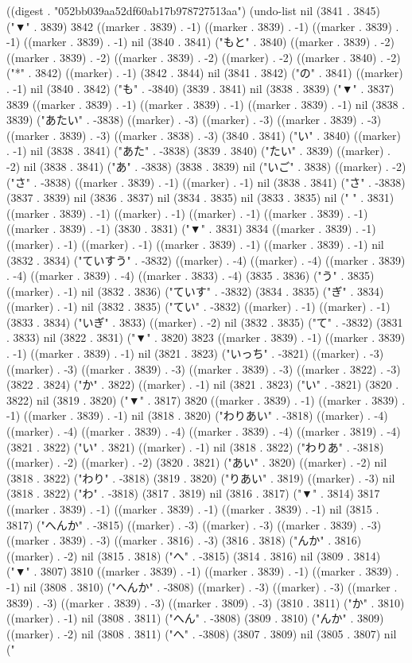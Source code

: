 
((digest . "052bb039aa52df60ab17b978727513aa") (undo-list nil (3841 . 3845) ("▼" . 3839) 3842 ((marker . 3839) . -1) ((marker . 3839) . -1) ((marker . 3839) . -1) ((marker . 3839) . -1) nil (3840 . 3841) ("もと" . 3840) ((marker . 3839) . -2) ((marker . 3839) . -2) ((marker . 3839) . -2) ((marker) . -2) ((marker . 3840) . -2) ("*" . 3842) ((marker) . -1) (3842 . 3844) nil (3841 . 3842) ("の" . 3841) ((marker) . -1) nil (3840 . 3842) ("も" . -3840) (3839 . 3841) nil (3838 . 3839) ("▼" . 3837) 3839 ((marker . 3839) . -1) ((marker . 3839) . -1) ((marker . 3839) . -1) nil (3838 . 3839) ("あたい" . -3838) ((marker) . -3) ((marker) . -3) ((marker . 3839) . -3) ((marker . 3839) . -3) ((marker . 3838) . -3) (3840 . 3841) ("い" . 3840) ((marker) . -1) nil (3838 . 3841) ("あた" . -3838) (3839 . 3840) ("たい" . 3839) ((marker) . -2) nil (3838 . 3841) ("あ" . -3838) (3838 . 3839) nil ("いご" . 3838) ((marker) . -2) ("さ" . -3838) ((marker . 3839) . -1) ((marker) . -1) nil (3838 . 3841) ("さ" . -3838) (3837 . 3839) nil (3836 . 3837) nil (3834 . 3835) nil (3833 . 3835) nil (" " . 3831) ((marker . 3839) . -1) ((marker) . -1) ((marker) . -1) ((marker . 3839) . -1) ((marker . 3839) . -1) (3830 . 3831) ("▼" . 3831) 3834 ((marker . 3839) . -1) ((marker) . -1) ((marker) . -1) ((marker . 3839) . -1) ((marker . 3839) . -1) nil (3832 . 3834) ("ていすう" . -3832) ((marker) . -4) ((marker) . -4) ((marker . 3839) . -4) ((marker . 3839) . -4) ((marker . 3833) . -4) (3835 . 3836) ("う" . 3835) ((marker) . -1) nil (3832 . 3836) ("ていす" . -3832) (3834 . 3835) ("ぎ" . 3834) ((marker) . -1) nil (3832 . 3835) ("てい" . -3832) ((marker) . -1) ((marker) . -1) (3833 . 3834) ("いぎ" . 3833) ((marker) . -2) nil (3832 . 3835) ("て" . -3832) (3831 . 3833) nil (3822 . 3831) ("▼" . 3820) 3823 ((marker . 3839) . -1) ((marker . 3839) . -1) ((marker . 3839) . -1) nil (3821 . 3823) ("いっち" . -3821) ((marker) . -3) ((marker) . -3) ((marker . 3839) . -3) ((marker . 3839) . -3) ((marker . 3822) . -3) (3822 . 3824) ("か" . 3822) ((marker) . -1) nil (3821 . 3823) ("い" . -3821) (3820 . 3822) nil (3819 . 3820) ("▼" . 3817) 3820 ((marker . 3839) . -1) ((marker . 3839) . -1) ((marker . 3839) . -1) nil (3818 . 3820) ("わりあい" . -3818) ((marker) . -4) ((marker) . -4) ((marker . 3839) . -4) ((marker . 3839) . -4) ((marker . 3819) . -4) (3821 . 3822) ("い" . 3821) ((marker) . -1) nil (3818 . 3822) ("わりあ" . -3818) ((marker) . -2) ((marker) . -2) (3820 . 3821) ("あい" . 3820) ((marker) . -2) nil (3818 . 3822) ("わり" . -3818) (3819 . 3820) ("りあい" . 3819) ((marker) . -3) nil (3818 . 3822) ("わ" . -3818) (3817 . 3819) nil (3816 . 3817) ("▼" . 3814) 3817 ((marker . 3839) . -1) ((marker . 3839) . -1) ((marker . 3839) . -1) nil (3815 . 3817) ("へんか" . -3815) ((marker) . -3) ((marker) . -3) ((marker . 3839) . -3) ((marker . 3839) . -3) ((marker . 3816) . -3) (3816 . 3818) ("んか" . 3816) ((marker) . -2) nil (3815 . 3818) ("へ" . -3815) (3814 . 3816) nil (3809 . 3814) ("▼" . 3807) 3810 ((marker . 3839) . -1) ((marker . 3839) . -1) ((marker . 3839) . -1) nil (3808 . 3810) ("へんか" . -3808) ((marker) . -3) ((marker) . -3) ((marker . 3839) . -3) ((marker . 3839) . -3) ((marker . 3809) . -3) (3810 . 3811) ("か" . 3810) ((marker) . -1) nil (3808 . 3811) ("へん" . -3808) (3809 . 3810) ("んか" . 3809) ((marker) . -2) nil (3808 . 3811) ("へ" . -3808) (3807 . 3809) nil (3805 . 3807) nil ("
